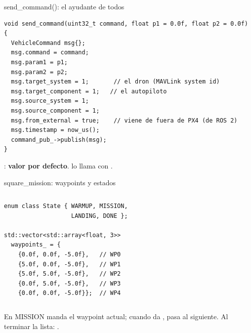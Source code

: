 \begin{frame}[fragile]{send\_command(): el ayudante de todos}
  \begin{lstlisting}[style=cpp,caption={Igual en todos los ejemplos}]
void send_command(uint32_t command, float p1 = 0.0f, float p2 = 0.0f) {
  VehicleCommand msg{};
  msg.command = command;
  msg.param1 = p1;
  msg.param2 = p2;
  msg.target_system = 1;       // el dron (MAVLink system id)
  msg.target_component = 1;   // el autopiloto
  msg.source_system = 1;
  msg.source_component = 1;
  msg.from_external = true;    // viene de fuera de PX4 (de ROS 2)
  msg.timestamp = now_us();
  command_pub_->publish(msg);
}
  \end{lstlisting}
  \small {}: \textbf{valor por defecto}.  lo
  llama con .
\end{frame}

\begin{frame}[fragile]{square\_mission: waypoints y estados}
  \begin{columns}[c]
    \begin{lstlisting}[style=cpp]
enum class State { WARMUP, MISSION,
                   LANDING, DONE };

std::vector<std::array<float, 3>>
  waypoints_ = {
    {0.0f, 0.0f, -5.0f},   // WP0
    {5.0f, 0.0f, -5.0f},   // WP1
    {5.0f, 5.0f, -5.0f},   // WP2
    {0.0f, 5.0f, -5.0f},   // WP3
    {0.0f, 0.0f, -5.0f}};  // WP4
    \end{lstlisting}
    \centering
  \end{columns}
  \small En MISSION manda el waypoint actual; cuando  da , pasa al siguiente. Al
  terminar la lista: .
\end{frame}

